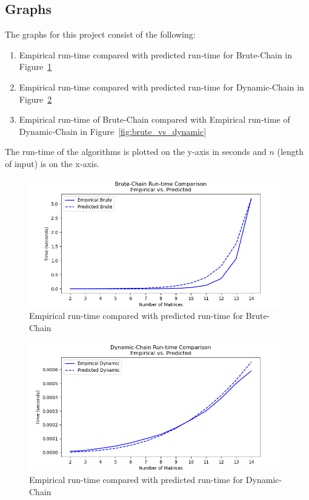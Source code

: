 \documentclass[letterpaper,titlepage]{article}
\begin{document}
\newpage

\subsection{Graphs}
The graphs for this project consist of the following:
\begin{enumerate}
    \item Empirical run-time compared with predicted run-time for Brute-Chain in Figure~\ref{fig:brute-chain}
    \item Empirical run-time compared with predicted run-time for Dynamic-Chain in Figure~\ref{fig:dynamic-chain}
    \item Empirical run-time of Brute-Chain compared with Empirical run-time of Dynamic-Chain in Figure~\ref{fig:brute_vs_dynamic}
\end{enumerate}
The run-time of the algorithms is plotted on the y-axis in seconds and $n$ (length of input) is on the x-axis.
\begin{figure}[h!]
    \includegraphics[scale=.8]{brute_emp_vs_pred.png}
    \caption{Empirical run-time compared with predicted run-time for Brute-Chain}
    \label{fig:brute-chain}
\end{figure}

\begin{figure}[h!]
    \includegraphics[scale=.8]{dynamic_emp_vs_pred.png} 
    \caption{Empirical run-time compared with predicted run-time for Dynamic-Chain}
    \label{fig:dynamic-chain}
\end{figure}
\end{document}
